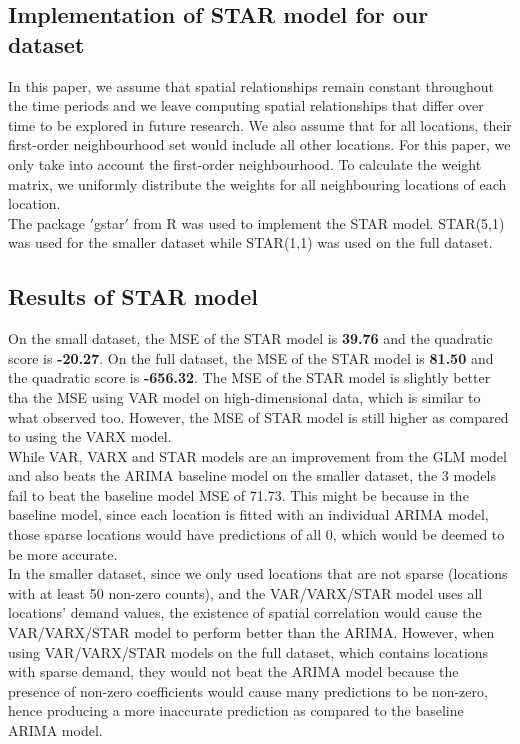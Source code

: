 \documentclass[nonblindrev,msom]{informs3} %
\begin{document}
\subsection{Implementation of STAR model for our dataset}

\noindent In this paper, we assume that spatial relationships remain constant throughout the time periods and we leave computing spatial relationships that differ over time to be explored in future research. We also assume that for all locations, their first-order neighbourhood set would include all other locations. For this paper, we only take into account the first-order neighbourhood. To calculate the weight matrix, we uniformly distribute the weights for all neighbouring locations of each location. \\

\noindent The package $'$gstar$'$ from R was used to implement the STAR model. STAR(5,1) was used for the smaller dataset while STAR(1,1) was used on the full dataset.

\subsection{Results of STAR model}

On the small dataset, the MSE of the STAR model is \textbf{39.76} and the quadratic score is \textbf{-20.27}. On the full dataset, the MSE of the STAR model is \textbf{81.50} and the quadratic score is \textbf{-656.32}. The MSE of the STAR model is slightly better tha the MSE using VAR model on high-dimensional data, which is similar to what \cite{Abolfazl2017} observed too. However, the MSE of STAR model is still higher as compared to using the VARX model. \\

\noindent While VAR, VARX and STAR models are an improvement from the GLM model and also beats the ARIMA baseline model on the smaller dataset, the 3 models fail to beat the baseline model MSE of 71.73. This might be because in the baseline model, since each location is fitted with an individual ARIMA model, those sparse locations would have predictions of all 0, which would be deemed to be more accurate. \\

\noindent In the smaller dataset, since we only used locations that are not sparse (locations with at least 50 non-zero counts), and the VAR/VARX/STAR model uses all locations' demand values, the existence of spatial correlation would cause the VAR/VARX/STAR model to perform better than the ARIMA. However, when using VAR/VARX/STAR models on the full dataset, which contains locations with sparse demand, they would not beat the ARIMA model because the presence of non-zero coefficients would cause many predictions to be non-zero, hence producing a more inaccurate prediction as compared to the baseline ARIMA model. \\
\end{document}
